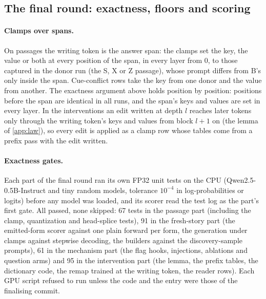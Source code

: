 \subsection{The final round: exactness, floors and scoring}\label{app:impl-j}

\paragraph{Clamps over spans.} On passages the writing token is the answer span: the clamps set the key, the value or both at every position of the span, in every layer from 0, to those captured in the donor run (the S, X or Z passage), whose prompt differs from B's only inside the span. Cue-conflict rows take the key from one donor and the value from another. The exactness argument above holds position by position: positions before the span are identical in all runs, and the span's keys and values are set in every layer. In the interventions an edit written at depth $l$ reaches later tokens only through the writing token's keys and values from block $l{+}1$ on (the lemma of \cref{app:law}), so every edit is applied as a clamp row whose tables come from a prefix pass with the edit written.

\paragraph{Exactness gates.} Each part of the final round ran its own FP32 unit tests on the CPU (Qwen2.5-0.5B-Instruct and tiny random models, tolerance $10^{-4}$ in log-probabilities or logits) before any model was loaded, and its scorer read the test log as the part's first gate. All passed, none skipped: 67 tests in the passage part (including the clamp, quantization and head-splice tests), 91 in the fresh-story part (the emitted-form scorer against one plain forward per form, the generation under clamps against stepwise decoding, the builders against the discovery-sample prompts), 61 in the mechanism part (the flag hooks, injections, ablations and question arms) and 95 in the intervention part (the lemma, the prefix tables, the dictionary code, the remap trained at the writing token, the reader rows). Each GPU script refused to run unless the code and the entry were those of the finalising commit. %

